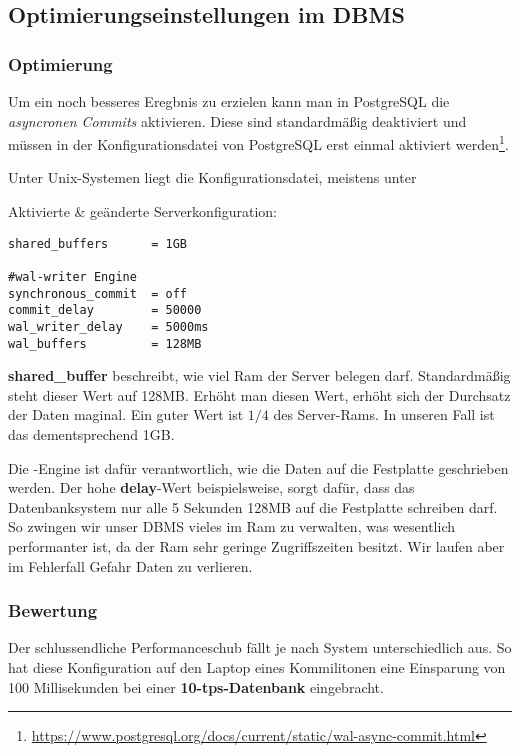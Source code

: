 \subsection{Optimierungseinstellungen im DBMS}
\subsubsection*{Optimierung}
Um ein noch besseres Eregbnis zu erzielen kann man in PostgreSQL die
\textit{asyncronen Commits} aktivieren. Diese sind standardmäßig deaktiviert
und müssen in der Konfigurationsdatei von PostgreSQL erst einmal aktiviert
werden\footnote{\url{https://www.postgresql.org/docs/current/static/wal-async-commit.html}}.

Unter Unix-Systemen liegt die Konfigurationsdatei, meistens unter \newline
{}

Aktivierte \& geänderte Serverkonfiguration:
\begin{lstlisting}[title={Veränderte Serverkonfiguration}]
shared_buffers		= 1GB

#wal-writer Engine
synchronous_commit	= off
commit_delay		= 50000
wal_writer_delay	= 5000ms
wal_buffers			= 128MB
\end{lstlisting}

\textbf{shared\_buffer} beschreibt, wie viel Ram der Server belegen darf.
Standardmäßig steht dieser Wert auf 128MB. Erhöht man diesen Wert, erhöht
sich der Durchsatz der Daten maginal. Ein guter Wert ist $1/4$ des
Server-Rams. In unseren Fall ist das dementsprechend 1GB.

Die -Engine ist dafür verantwortlich, wie die Daten auf die
Festplatte geschrieben werden. Der hohe \textbf{delay}-Wert beispielsweise, sorgt
dafür, dass das Datenbanksystem nur alle 5 Sekunden 128MB auf die Festplatte
schreiben darf. So zwingen wir unser DBMS vieles im Ram zu verwalten, was
wesentlich performanter ist, da der Ram sehr geringe Zugriffszeiten besitzt. Wir
laufen aber im Fehlerfall Gefahr Daten zu verlieren.

\subsubsection*{Bewertung}
Der schlussendliche Performanceschub fällt je nach System unterschiedlich aus.
So hat diese Konfiguration auf den Laptop eines Kommilitonen eine Einsparung von 100
Millisekunden bei einer \textbf{10-tps-Datenbank} eingebracht.

